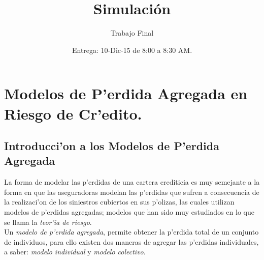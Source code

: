 \documentclass[10pt, oneside]{article}
\begin{document}
 \title{Simulaci\'on}
 \author{Trabajo Final}
 \date{Entrega: 10-Dic-15 de 8:00 a 8:30 AM.}
  \maketitle

\addtolength{\headheight}{10pt}
\addtolength{\textwidth}{80pt}

\newcommand{\bin}[2]{
 \left(
 \begin{array}{@{}c@{}}
  #1 \\ #2
 \end{array}
\right) }

\section*{Modelos de P'erdida Agregada en Riesgo de Cr'edito.}

\subsection*{Introducci'on a los Modelos de P'erdida Agregada}

\noindent
La forma de modelar las p'erdidas de una cartera crediticia es muy semejante a la forma en que las aseguradoras modelan las p'erdidas que sufren a consecuencia de la realizaci'on de los siniestros cubiertos en sus p'olizas, las cuales utilizan modelos de p'erdidas agregadas; modelos que han sido muy estudiados en lo que se llama la \emph{teor'ia de riesgo}.\\

\noindent
Un \emph{modelo de p'erdida agregada}, permite obtener la p'erdida total de un conjunto de individuos, para ello existen dos maneras de agregar las p'erdidas individuales, a saber:  \emph{modelo individual} y \emph{modelo colectivo}.
\end{document}
